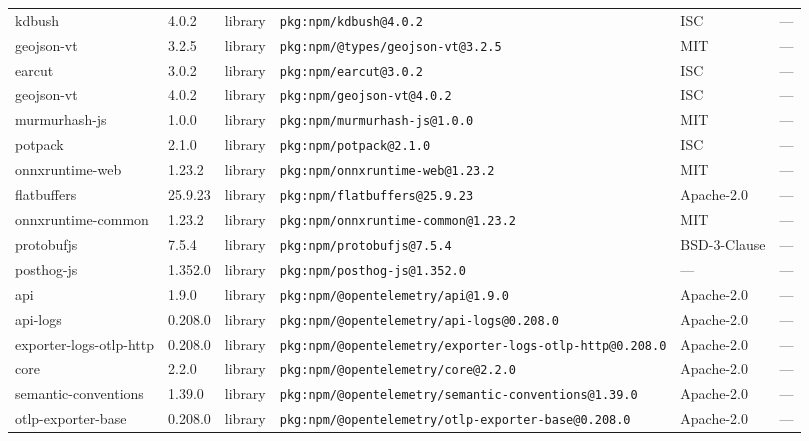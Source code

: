 \documentclass[11pt,a4paper]{article}
\begin{document}
\begin{longtable}{|p{4cm}|p{2cm}|p{1.6cm}|p{5cm}|p{1.5cm}|p{3.5cm}|}
\raggedright kdbush & 4.0.2 & library & \small\texttt{pkg:npm/kdbush@4.0.2} & ISC & \small — \\
\raggedright geojson-vt & 3.2.5 & library & \small\texttt{pkg:npm/@types/geojson-vt@3.2.5} & MIT & \small — \\
\raggedright earcut & 3.0.2 & library & \small\texttt{pkg:npm/earcut@3.0.2} & ISC & \small — \\
\raggedright geojson-vt & 4.0.2 & library & \small\texttt{pkg:npm/geojson-vt@4.0.2} & ISC & \small — \\
\raggedright murmurhash-js & 1.0.0 & library & \small\texttt{pkg:npm/murmurhash-js@1.0.0} & MIT & \small — \\
\raggedright potpack & 2.1.0 & library & \small\texttt{pkg:npm/potpack@2.1.0} & ISC & \small — \\
\raggedright onnxruntime-web & 1.23.2 & library & \small\texttt{pkg:npm/onnxruntime-web@1.23.2} & MIT & \small — \\
\raggedright flatbuffers & 25.9.23 & library & \small\texttt{pkg:npm/flatbuffers@25.9.23} & Apache-2.0 & \small — \\
\raggedright onnxruntime-common & 1.23.2 & library & \small\texttt{pkg:npm/onnxruntime-common@1.23.2} & MIT & \small — \\
\raggedright protobufjs & 7.5.4 & library & \small\texttt{pkg:npm/protobufjs@7.5.4} & BSD-3-Clause & \small — \\
\raggedright posthog-js & 1.352.0 & library & \small\texttt{pkg:npm/posthog-js@1.352.0} & — & \small — \\
\raggedright api & 1.9.0 & library & \small\texttt{pkg:npm/@opentelemetry/api@1.9.0} & Apache-2.0 & \small — \\
\raggedright api-logs & 0.208.0 & library & \small\texttt{pkg:npm/@opentelemetry/api-logs@0.208.0} & Apache-2.0 & \small — \\
\raggedright exporter-logs-otlp-http & 0.208.0 & library & \small\texttt{pkg:npm/@opentelemetry/exporter-logs-otlp-http@0.208.0} & Apache-2.0 & \small — \\
\raggedright core & 2.2.0 & library & \small\texttt{pkg:npm/@opentelemetry/core@2.2.0} & Apache-2.0 & \small — \\
\raggedright semantic-conventions & 1.39.0 & library & \small\texttt{pkg:npm/@opentelemetry/semantic-conventions@1.39.0} & Apache-2.0 & \small — \\
\raggedright otlp-exporter-base & 0.208.0 & library & \small\texttt{pkg:npm/@opentelemetry/otlp-exporter-base@0.208.0} & Apache-2.0 & \small — \\

\end{longtable}
\end{document}
